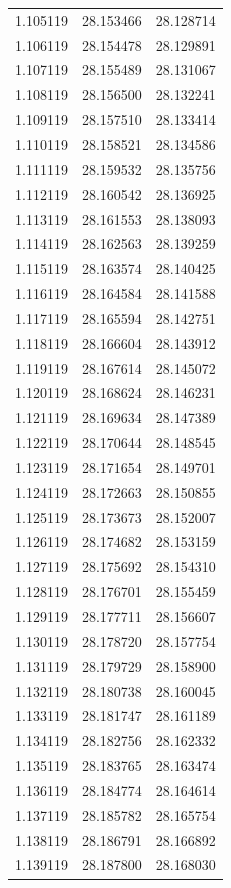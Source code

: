 \begin{tabular}{rrr}
1.105119 & 28.153466 & 28.128714 \\
1.106119 & 28.154478 & 28.129891 \\
1.107119 & 28.155489 & 28.131067 \\
1.108119 & 28.156500 & 28.132241 \\
1.109119 & 28.157510 & 28.133414 \\
1.110119 & 28.158521 & 28.134586 \\
1.111119 & 28.159532 & 28.135756 \\
1.112119 & 28.160542 & 28.136925 \\
1.113119 & 28.161553 & 28.138093 \\
1.114119 & 28.162563 & 28.139259 \\
1.115119 & 28.163574 & 28.140425 \\
1.116119 & 28.164584 & 28.141588 \\
1.117119 & 28.165594 & 28.142751 \\
1.118119 & 28.166604 & 28.143912 \\
1.119119 & 28.167614 & 28.145072 \\
1.120119 & 28.168624 & 28.146231 \\
1.121119 & 28.169634 & 28.147389 \\
1.122119 & 28.170644 & 28.148545 \\
1.123119 & 28.171654 & 28.149701 \\
1.124119 & 28.172663 & 28.150855 \\
1.125119 & 28.173673 & 28.152007 \\
1.126119 & 28.174682 & 28.153159 \\
1.127119 & 28.175692 & 28.154310 \\
1.128119 & 28.176701 & 28.155459 \\
1.129119 & 28.177711 & 28.156607 \\
1.130119 & 28.178720 & 28.157754 \\
1.131119 & 28.179729 & 28.158900 \\
1.132119 & 28.180738 & 28.160045 \\
1.133119 & 28.181747 & 28.161189 \\
1.134119 & 28.182756 & 28.162332 \\
1.135119 & 28.183765 & 28.163474 \\
1.136119 & 28.184774 & 28.164614 \\
1.137119 & 28.185782 & 28.165754 \\
1.138119 & 28.186791 & 28.166892 \\
1.139119 & 28.187800 & 28.168030 \\

\end{tabular}
